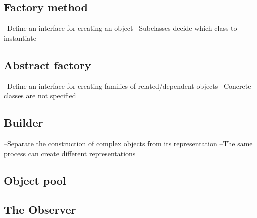 \subsection{Factory method}
–Define an interface for creating an object
–Subclasses decide which class to instantiate

\subsection{Abstract factory}
–Define an interface for creating families of related/dependent objects
–Concrete classes are not specified

\subsection{Builder}
–Separate the construction of complex objects from its representation
–The same process can create different representations

\subsection{Object pool}

\subsection{The Observer}